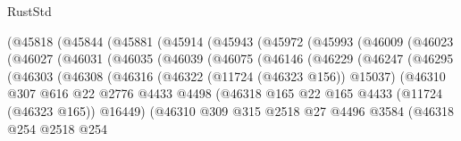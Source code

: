 \begin{lexlean}{RustStd}
\begin{coremodule}
              (@45818
                (@45844
                  (@45881
                    (@45914
                      (@45943
                        (@45972
                          (@45993
                            (@46009
                              (@46023
                                (@46027
                                  (@46031
                                    (@46035
                                      (@46039
                                        (@46075
                                          (@46146
                                            (@46229
                                              (@46247
                                                (@46295
                                                  (@46303
                                                    (@46308
                                                      (@46316
                                                        (@46322 (@11724 (@46323 @156)) @15037)
                                                        (@46310
                                                          @307
                                                          @616
                                                          @22
                                                          @2776
                                                          @4433
                                                          @4498
                                                          (@46318
                                                            @165
                                                            @22
                                                            @165
                                                            @4433
                                                            (@11724 (@46323 @165))
                                                            @16449)
                                                          (@46310
                                                            @309
                                                            @315
                                                            @2518
                                                            @27
                                                            @4496
                                                            @3584
                                                            (@46318
                                                              @254
                                                              @2518
                                                              @254

\end{coremodule}
\end{lexlean}
